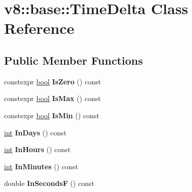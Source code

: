 \hypertarget{classv8_1_1base_1_1TimeDelta}{}\section{v8\+:\+:base\+:\+:Time\+Delta Class Reference}
\label{classv8_1_1base_1_1TimeDelta}
\subsection*{Public Member Functions}
\begin{DoxyCompactItemize}
\item 
\mbox{\label{classv8_1_1base_1_1TimeDelta_a50801573147a5ee1710d0b76eadd5d16}} 
constexpr \mbox{\hyperlink{classbool}{bool}} {\bfseries Is\+Zero} () const
\item 
\mbox{\label{classv8_1_1base_1_1TimeDelta_ac3181f6214df3e7cd7daee884061af5c}} 
constexpr \mbox{\hyperlink{classbool}{bool}} {\bfseries Is\+Max} () const
\item 
\mbox{\label{classv8_1_1base_1_1TimeDelta_af74abda7e743e46b01d281c9492e79fc}} 
constexpr \mbox{\hyperlink{classbool}{bool}} {\bfseries Is\+Min} () const
\item 
\mbox{\label{classv8_1_1base_1_1TimeDelta_a5efa208ef9617c552417540f0c94cfd4}} 
\mbox{\hyperlink{classint}{int}} {\bfseries In\+Days} () const
\item 
\mbox{\label{classv8_1_1base_1_1TimeDelta_a55e70d6c046d5bc6546064548b3878c0}} 
\mbox{\hyperlink{classint}{int}} {\bfseries In\+Hours} () const
\item 
\mbox{\label{classv8_1_1base_1_1TimeDelta_a43f6f894f864f2638b148e8825d2e427}} 
\mbox{\hyperlink{classint}{int}} {\bfseries In\+Minutes} () const
\item 
\mbox{\label{classv8_1_1base_1_1TimeDelta_a908286b99a683cc248a717a8ace4ed9c}} 
double {\bfseries In\+SecondsF} () const
\item 
\mbox{\label{classv8_1_1base_1_1TimeDelta_a2495850a348e1a42b9ac377d52db4daf}} 

\end{DoxyCompactItemize}
